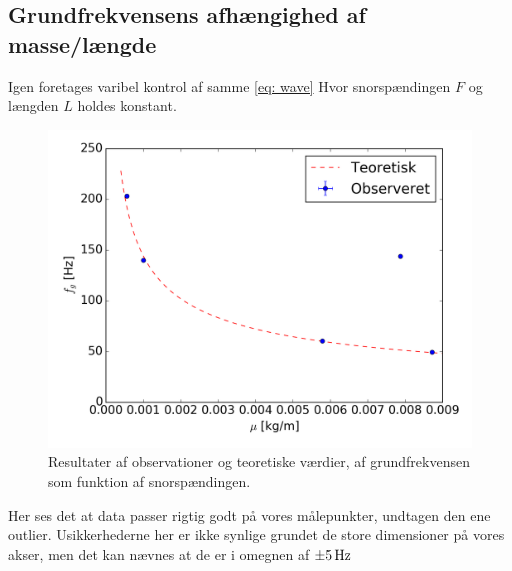 \documentclass[A2_main.tex]{subfiles}
\begin{document}
\subsection{Grundfrekvensens afhængighed af masse/længde}
Igen foretages varibel kontrol af samme \cref{eq: wave} Hvor snorspændingen $F$ og længden $L$ holdes konstant.
\begin{figure}[H]
    \includegraphics[width=\linewidth]{frekvensMu.png}
    \caption{Resultater af observationer og teoretiske værdier, af grundfrekvensen som funktion af snorspændingen.}
    \label{fig:frekvensMu}
\end{figure}
Her ses det at data passer rigtig godt på vores målepunkter, undtagen den ene outlier. Usikkerhederne her er ikke synlige grundet de store dimensioner på vores akser, men det kan nævnes at de er i omegnen af $\SI{\pm 5}{\Hz}$
\end{document}
